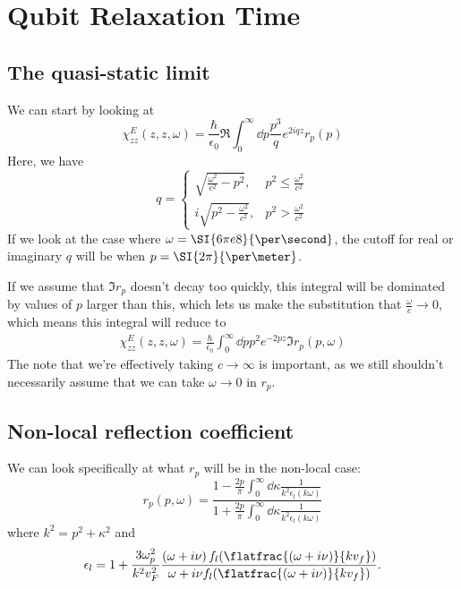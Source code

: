 \documentclass[../../main.tex]{subfiles}
\begin{document}
\section{Qubit Relaxation Time}

\subsection{The quasi-static limit}
We can start by looking at
\begin{equation}
	\chi_{zz}^{E}(z, z, \omega) = \frac{\hbar}{\epsilon_0}\Re\int_0^\infty \dd{p} \frac{p^3}{q} e^{2iqz}r_p(p)
\end{equation}
Here, we have
\begin{equation}
	q = \begin{cases}
			\sqrt{\frac{\omega^2}{c^2} - p^2}, & p^2 \le  \frac{\omega^2}{c^2} \\
			i \sqrt{p^2 - \frac{\omega^2}{c^2}}, & p^2 > \frac{\omega^2}{c^2}
		\end{cases}
\end{equation}
If we look at the case where $\omega = \SI{6\pi e8}{\per\second}$, the cutoff for real or imaginary $q$ will be when $p = \SI{2\pi}{\per\meter}$.

If we assume that $\Im r_p$ doesn't decay too quickly, this integral will be dominated by values of $p$ larger than this, which lets us make the substitution that $\frac{\omega}{c} \rightarrow 0$, which means this integral will reduce to
\begin{align}
	\chi_{zz}^{E}(z, z, \omega) = \frac{\hbar}{\epsilon_0}\int_0^\infty \dd{p} p^2 e^{-2pz}\Im r_p(p, \omega)
\end{align}
The note that we're effectively taking $c\rightarrow \infty$ is important, as we still shouldn't necessarily assume that we can take $\omega \rightarrow 0$ in $r_p$.

\subsection{Non-local reflection coefficient}
We can look specifically at what $r_p$ will be in the non-local case:
\begin{equation}
	r_p(p, \omega) = \frac{1 - \frac{2p}{\pi} \int_0^\infty \dd{\kappa} \frac{1}{k^2 \epsilon_l(k \omega)}}{1 + \frac{2p}{\pi} \int_0^\infty \dd{\kappa} \frac{1}{k^2 \epsilon_l(k \omega)}}
\end{equation}
where $k^2 = p^2 + \kappa^2$ and
\begin{equation}
	\epsilon_l = 1 + \frac{3 \omega_p^2}{k^2 v_F^2} \frac{\left(\omega + i \nu \right) f_l(\flatfrac{(\omega + i \nu)}{k v_f})}{\omega + i \nu f_l(\flatfrac{(\omega + i \nu)}{k v_f})}.
\end{equation}
\end{document}
